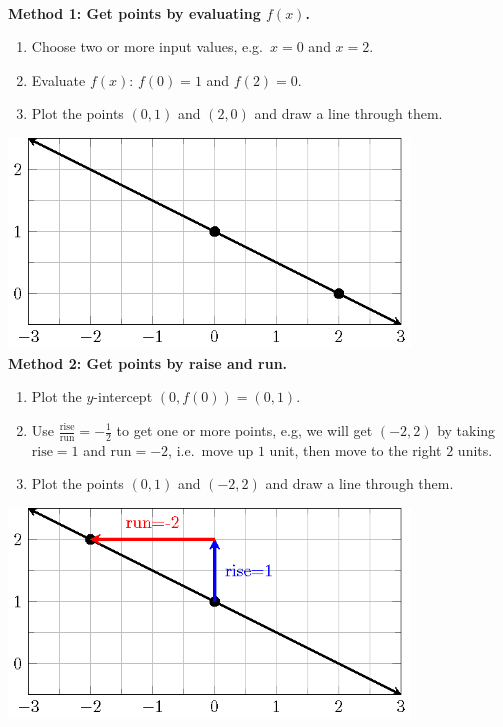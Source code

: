\documentclass[en,11pt]{elegantbook}
\let\BeginKnitrBlock\begin \let\EndKnitrBlock\end
\begin{document}
\BeginKnitrBlock{solution}
{}\\

\textbf{Method 1: Get points by evaluating \(f(x)\).}

\begin{enumerate}
\def\labelenumi{\arabic{enumi}.}

\item
  Choose two or more input values, e.g.~\(x=0\) and \(x=2\).
\item
  Evaluate \(f(x)\): \(f(0)=1\) and \(f(2)=0\).
\item
  Plot the points \((0, 1)\) and \((2, 0)\) and draw a line through them.
\end{enumerate}

\includegraphics[width=0.8\textwidth,height=\textheight]{figs/tikz-linear-function-example-a.png}\\

\textbf{Method 2: Get points by raise and run.}

\begin{enumerate}
\def\labelenumi{\arabic{enumi}.}

\item
  Plot the \(y\)-intercept \((0, f(0))=(0, 1)\).
\item
  Use \(\frac{\text{rise}}{\text{run}}=-\frac{1}{2}\) to get one or more points, e.g, we will get \((-2, 2)\) by taking \(\text{rise}=1\) and \(\text{run}=-2\), i.e.~move up \(1\) unit, then move to the right \(2\) units.
\item
  Plot the points \((0, 1)\) and \((-2, 2)\) and draw a line through them.
\end{enumerate}

\includegraphics[width=0.8\textwidth,height=\textheight]{figs/tikz-linear-function-example-b.png}\\
\EndKnitrBlock{solution}
\end{document}
